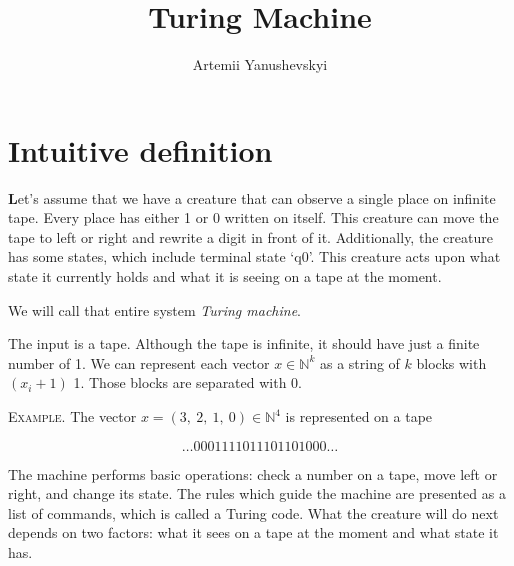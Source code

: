 \documentclass[12pt]{article}
\title{Turing Machine}
\author{Artemii Yanushevskyi}
\date{}
\newcommand\tab[1][-1em]{\hspace*{#1}}
\begin{document}
\maketitle

\begin{addmargin}[3em]{3em}
\end{addmargin}

\section{Intuitive definition}
\textbf{\large L}et's assume that we have a creature that can observe a single place on infinite tape. Every place has either 1 or 0 written on itself. This creature can move the tape to left or right and rewrite a digit in front of it. Additionally, the creature has some states, which include terminal state `$\mathrm{q}0$'. This creature acts upon what state it currently holds and what it is seeing on a tape at the moment. 

We will call that entire system \emph{Turing machine}.

The input is a tape. Although the tape is infinite, it should have just a finite number of 1.
We can represent each vector $x\in\mathbb{N}^k$ as a string of $k$ blocks with $(x_i+1)$ 1. Those blocks are separated with 0. 

 \vspace{5mm}
\begin{addmargin}[3em]{3em}
\tab
\textsc{Example.} The vector $x=(3,\ 2,\ 1,\ 0)\in\mathbb{N}^4$ is represented on a tape

{\large $$\dots 0001111011101101000\dots$$}

\end{addmargin}

The machine performs basic operations: check a number on a tape, move left or right, and change its state. The rules which guide the machine are presented as a list of commands, which is called a Turing code. What the creature will do next depends on two factors: what it sees on a tape at the moment and what state it has.
 
\end{document}
